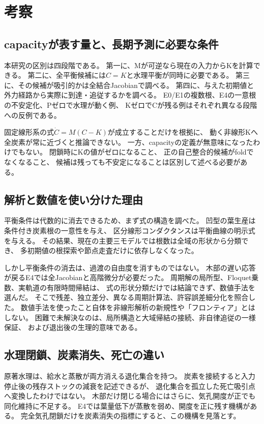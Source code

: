 \documentclass[a4paper,11pt]{ltjsarticle}
\begin{document}
\section{考察}
\subsection{capacityが表す量と、長期予測に必要な条件}
本研究の区別は四段階である。
第一に、Mが可逆なら現在の入力からKを計算できる。
第二に、全平衡候補には$C=K$と水理平衡が同時に必要である。
第三に、その候補が吸引的かは全結合Jacobianで調べる。
第四に、与えた初期値と外力経路から実際に到達・追従するかを調べる。
E0/E1の複数根、E4の一意根の不安定化、Pゼロで水理が動く例、
KゼロでCが残る例はそれぞれ異なる段階への反例である。

固定線形系の式$\dot C=M(C-K)$が成立することだけを根拠に、
動く非線形Kへ全炭素が常に近づくと推論できない。
一方、capacityの定義が無意味になったわけでもない。
閉鎖時にKの値がゼロになること、
正の自己整合的候補がfoldでなくなること、
候補は残っても不安定になることは区別して述べる必要がある。

\subsection{解析と数値を使い分けた理由}
平衡条件は代数的に消去できるため、まず式の構造を調べた。
凹型の葉生産は条件付き炭素根の一意性を与え、
区分線形コンダクタンスは平衡曲線の明示式を与える。
その結果、現在の主要三モデルでは根数は全域の形状から分類でき、
多初期値の根探索や節点走査だけに依存しなくなった。

しかし平衡条件の消去は、過渡の自由度を消すものではない。
木部の遅い応答が戻るE4では全Jacobianと高階微分が必要だった。
周期解の局所型、Floquet乗数、実軌道の有限時間帰結は、
式の形状分類だけでは結論できず、数値手法を選んだ。
そこで残差、独立差分、異なる周期計算法、許容誤差細分化を照合した。
数値手法を使ったこと自体を非線形解析の新規性や「フロンティア」とはしない。
困難で未解決なのは、局所構造と大域帰結の接続、非自律追従の一様保証、
および退出後の生理的意味である。

\subsection{水理閉鎖、炭素消失、死亡の違い}
原著水理は、給水と蒸散が両方消える退化集合を持つ。
炭素を接続すると入力停止後の残存ストックの減衰を記述できるが、
退化集合を孤立した死亡吸引点へ変換したわけではない。
木部だけ閉じる場合にはさらに、気孔開度が正でも同化維持に不足する。
E4では葉量低下が蒸散を弱め、開度を正に残す機構がある。
完全気孔閉鎖だけを炭素消失の指標にすると、この機構を見落とす。
\end{document}
